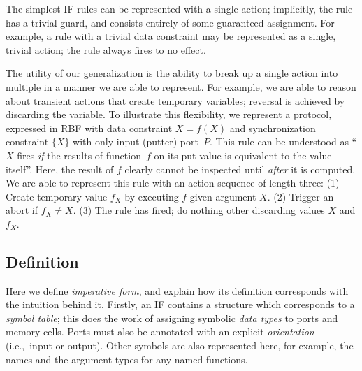 The simplest IF rules can be represented with a single action; implicitly, the rule has a trivial guard, and consists entirely of some guaranteed assignment. For example, a rule with a trivial data constraint may be represented as a single, trivial action; the rule always fires to no effect.

The utility of our generalization is the ability to break up a single action into multiple in a manner we are able to represent. For example, we are able to reason about transient actions that create temporary variables; reversal is achieved by discarding the variable. To illustrate this flexibility, we represent a protocol, expressed in RBF with data constraint $X=f(X)$ and synchronization constraint $\{X\}$ with only input (putter) port~$P$. This rule can be understood as ``$X$ fires \textit{if} the results of function~$f$ on its put value is equivalent to the value itself''. Here, the result of $f$ clearly cannot be inspected until \textit{after} it is computed. We are able to represent this rule with an action sequence of length three: (1) Create temporary value $f_X$ by executing $f$ given argument $X$. (2) Trigger an abort if $f_X\neq{}X$. (3) The rule has fired; do nothing other discarding values $X$ and $f_X$. 


\subsection{Definition}
\label{sec:imperative_form_definition}
Here we define \textit{imperative form}, and explain how its definition corresponds with the intuition behind it. Firstly, an IF contains a structure which corresponds to a \textit{symbol table}; this does the work of assigning symbolic \textit{data types} to ports and memory cells. Ports must also be annotated with an explicit \textit{orientation} (i.e.,\ input or output). Other symbols are also represented here, for example, the names and the argument types for any named functions.

